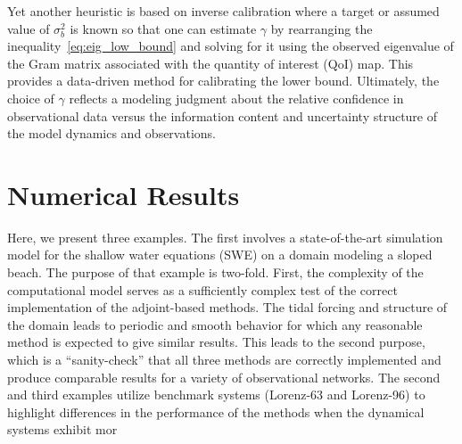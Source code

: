 \documentclass[final,1p,times]{elsarticle}
\begin{document}
Yet another heuristic is based on inverse calibration where a target or assumed value of $\sigma_b^2$ is known so that one can estimate $\gamma$ by rearranging the inequality~\eqref{eq:eig_low_bound} and solving for it using the observed eigenvalue of the Gram matrix associated with the quantity of interest (QoI) map. This provides a data-driven method for calibrating the lower bound. 
Ultimately, the choice of $ \gamma $ reflects a modeling judgment about the relative confidence in observational data versus the information content and uncertainty structure of the model dynamics and observations.
\section{Numerical Results}\label{sec:numerical_results}
Here, we present three examples. The first involves a state-of-the-art simulation model for the shallow water equations (SWE) on a domain modeling a sloped beach. The purpose of that example is two-fold. First, the complexity of the computational model serves as a sufficiently complex test of the correct implementation of the adjoint-based methods. The tidal forcing and structure of the domain leads to periodic and smooth behavior for which any reasonable method is expected to give similar results. This leads to the second purpose, which is a ``sanity-check'' that all three methods are correctly implemented and produce comparable results for a variety of observational networks.
The second and third examples utilize benchmark systems (Lorenz-63 and Lorenz-96) to highlight differences in the performance of the methods when the dynamical systems exhibit mor
\end{document}
